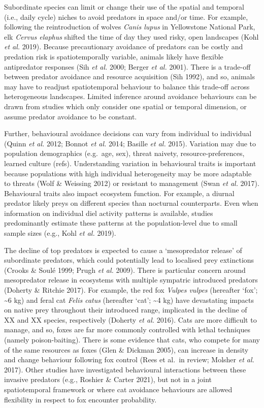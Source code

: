 \documentclass[11pt,a4paper,titlepage,twoside,openright]{style/unimelbthesis}
\begin{document}
\begin{mainmatter}
Subordinate species can limit or change their use of the spatial and temporal (i.e., daily cycle) niches to avoid predators in space and/or time. For example, following the reintroduction of wolves \emph{Canis lupus} in Yellowstone National Park, elk \emph{Cervus elaphus} shifted the time of day they used risky, open landscapes (Kohl \emph{et al.} 2019). Because precautionary avoidance of predators can be costly and predation risk is spatiotemporally variable, animals likely have flexible antipredator responses (Sih \emph{et al.} 2000; Berger \emph{et al.} 2001). There is a trade-off between predator avoidance and resource acquisition (Sih 1992), and so, animals may have to readjust spatiotemporal behaviour to balance this trade-off across heterogeneous landscapes. Limited inference around avoidance behaviours can be drawn from studies which only consider one spatial or temporal dimension, or assume predator avoidance to be constant.

Further, behavioural avoidance decisions can vary from individual to individual (Quinn \emph{et al.} 2012; Bonnot \emph{et al.} 2014; Basille \emph{et al.} 2015). Variation may due to population demographics (e.g.~age, sex), threat naivety, resource-preferences, learned culture (refs). Understanding variation in behavioural traits is important because populations with high individual heterogeneity may be more adaptable to threats (Wolf \& Weissing 2012) or resistant to management (Swan \emph{et al.} 2017). Behavioural traits also impact ecosystem function. For example, a diurnal predator likely preys on different species than nocturnal counterparts. Even when information on individual diel activity patterns is available, studies predominantly estimate these patterns at the population-level due to small sample sizes (e.g., Kohl \emph{et al.} 2019).

The decline of top predators is expected to cause a `mesopredator release' of subordinate predators, which could potentially lead to localised prey extinctions (Crooks \& Soulé 1999; Prugh \emph{et al.} 2009). There is particular concern around mesopredator release in ecosystems with multiple sympatric introduced predators (Doherty \& Ritchie 2017). For example, the red fox \emph{Vulpes vulpes} (hereafter `fox'; \textasciitilde6 kg) and feral cat \emph{Felis catus} (hereafter `cat'; \textasciitilde4 kg) have devastating impacts on native prey throughout their introduced range, implicated in the decline of XX and XX species, respectively (Doherty \emph{et al.} 2016). Cats are more difficult to manage, and so, foxes are far more commonly controlled with lethal techniques (namely poison-baiting). There is some evidence that cats, who compete for many of the same resources as foxes (Glen \& Dickman 2005), can increase in density and change behaviour following fox control (Rees et al.~in review; Molsher \emph{et al.} 2017). Other studies have investigated behavioural interactions between these invasive predators (e.g., Roshier \& Carter 2021), but not in a joint spatiotemporal framework or where cat avoidance behaviours are allowed flexibility in respect to fox encounter probability.


\end{mainmatter}
\end{document}
